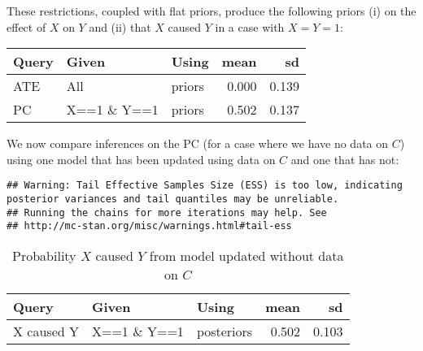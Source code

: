 \documentclass[
  12pt,
]{book}
\newenvironment{Shaded}{\begin{snugshade}}{\end{snugshade}}
\newcommand{\DataTypeTok}[1]{\textcolor[rgb]{0.13,0.29,0.53}{#1}}
\newcommand{\KeywordTok}[1]{\textcolor[rgb]{0.13,0.29,0.53}{\textbf{#1}}}
\newcommand{\NormalTok}[1]{#1}
\newcommand{\OperatorTok}[1]{\textcolor[rgb]{0.81,0.36,0.00}{\textbf{#1}}}
\newcommand{\StringTok}[1]{\textcolor[rgb]{0.31,0.60,0.02}{#1}}
\begin{document}
These restrictions, coupled with flat priors, produce the following priors (i) on the effect of \(X\) on \(Y\) and (ii) that \(X\) caused \(Y\) in a case with \(X=Y=1\):

\begin{tabular}{l|l|l|r|r}
\hline
Query & Given & Using & mean & sd\\
\hline
ATE & All & priors & 0.000 & 0.139\\
\hline
PC & X==1 \& Y==1 & priors & 0.502 & 0.137\\
\hline
\end{tabular}

We now compare inferences on the PC (for a case where we have no data on \(C\)) using one model that has been updated using data on \(C\) and one that has not:

\begin{Shaded}
\end{Shaded}

\begin{verbatim}
## Warning: Tail Effective Samples Size (ESS) is too low, indicating posterior variances and tail quantiles may be unreliable.
## Running the chains for more iterations may help. See
## http://mc-stan.org/misc/warnings.html#tail-ess
\end{verbatim}

\begin{table}

\caption{\label{tab:unnamed-chunk-80}Probability $X$ caused $Y$ from model updated without data on $C$}
\centering
\begin{tabular}[t]{l|l|l|r|r}
\hline
Query & Given & Using & mean & sd\\
\hline
X caused Y & X==1 \& Y==1 & posteriors & 0.502 & 0.103\\
\hline
\end{tabular}
\end{table}
\end{document}
